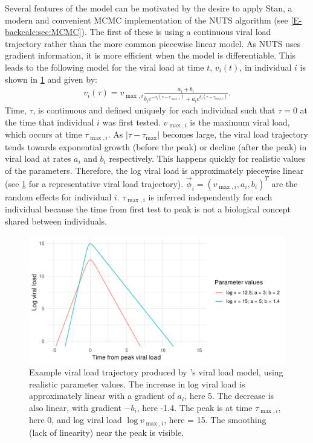 \documentclass[thesis.tex]{subfiles}
\begin{document}
Several features of the \textcite{hakkiOnset} model can be motivated by the desire to apply Stan, a modern and convenient MCMC implementation of the NUTS algorithm (see \cref{E-backcalc:sec:MCMC}).
The first of these is using a continuous viral load trajectory rather than the more common piecewise linear model.
As NUTS uses gradient information, it is more efficient when the model is differentiable.
This leads to the following model for the viral load at time $t$, $v_i(t)$, in individual $i$ is shown in \cref{ATACCC:fig:viral-load-model} and given by:
\begin{align}
v_i(\tau) = v_{\max,i} \frac{a_i+b_i}{b_ie^{-a_i(\tau-\tau_{\max,i})} + a_ie^{b_i(\tau-\tau_{max,i})}}. \label{ATACCC:eq:viral-load}
\end{align}
Time, $\tau$, is continuous and defined uniquely for each individual such that $\tau = 0$ at the time that individual $i$ was first tested.
$v_{\max,i}$ is the maximum viral load, which occurs at time $\tau_{\max,i}$.
As $\lvert \tau - \tau_{\max} \rvert$ becomes large, the viral load trajectory tends towards exponential growth (before the peak) or decline (after the peak) in viral load at rates $a_i$ and $b_i$ respectively.
This happens quickly for realistic values of the parameters.
Therefore, the log viral load is approximately piecewise linear (see \cref{ATACCC:fig:viral-load-model} for a representative viral load trajectory).
$\vec{\phi}_i = (v_{\max,i}, a_i, b_i)^T$ are the random effects for individual $i$.
$\tau_{\max,i}$ is inferred independently for each individual because the time from first test to peak is not a biological concept shared between individuals.
\begin{figure}
  \centering \includegraphics{ATACCC/typical_trajectory}
  \caption[Example viral load model trajectory.]{Example viral load trajectory produced by \textcite{hakkiOnset}'s viral load model, using realistic parameter values. The increase in log viral load is approximately linear with a gradient of $a_i$, here 5. The decrease is also linear, with gradient $-b_i$, here -1.4. The peak is at time $\tau_{\max,i}$, here 0, and log viral load $\log v_{\max,i}$, here = 15. The smoothing (lack of linearity) near the peak is visible. \label{ATACCC:fig:viral-load-model}}
\end{figure}
\end{document}
